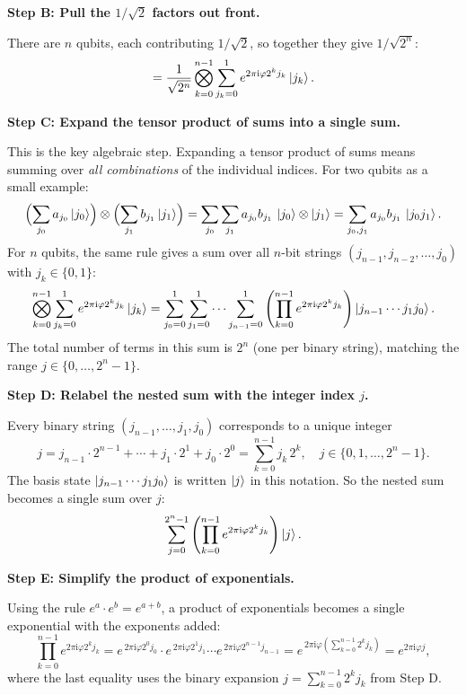 \documentclass[12pt,a4paper]{article}
\newcommand{\ii}{\mathrm{i}}
\begin{document}
\medskip
\noindent\textbf{Step B: Pull the $1/\sqrt{2}$ factors out front.}

There are $n$ qubits, each contributing $1/\sqrt{2}$, so together they give $1/\sqrt{2^n}$:
\[
  = \frac{1}{\sqrt{2^n}} \bigotimes_{k=0}^{n-1} \sum_{j_k=0}^{1} e^{2\pi\ii\varphi 2^k j_k}\Ket{j_k}.
\]

\medskip
\noindent\textbf{Step C: Expand the tensor product of sums into a single sum.}

This is the key algebraic step. Expanding a tensor product of sums means
summing over \emph{all combinations} of the individual indices. For two qubits
as a small example:
\[
  \Bigl(\sum_{j_0} a_{j_0}\Ket{j_0}\Bigr) \otimes \Bigl(\sum_{j_1} b_{j_1}\Ket{j_1}\Bigr)
  = \sum_{j_0}\sum_{j_1} a_{j_0} b_{j_1}\,\Ket{j_0}\otimes\Ket{j_1}
  = \sum_{j_0, j_1} a_{j_0} b_{j_1}\,\Ket{j_0 j_1}.
\]
For $n$ qubits, the same rule gives a sum over all $n$-bit strings
$(j_{n-1}, j_{n-2}, \ldots, j_0)$ with $j_k \in \{0,1\}$:
\[
  \bigotimes_{k=0}^{n-1} \sum_{j_k=0}^{1} e^{2\pi\ii\varphi 2^k j_k}\Ket{j_k}
  = \sum_{j_0=0}^{1}\sum_{j_1=0}^{1}\cdots\sum_{j_{n-1}=0}^{1}
    \left(\prod_{k=0}^{n-1} e^{2\pi\ii\varphi 2^k j_k}\right)
    \Ket{j_{n-1}\cdots j_1 j_0}.
\]
The total number of terms in this sum is $2^n$ (one per binary string), matching
the range $j \in \{0, \ldots, 2^n-1\}$.

\medskip
\noindent\textbf{Step D: Relabel the nested sum with the integer index $j$.}

Every binary string $(j_{n-1},\ldots,j_1,j_0)$ corresponds to a unique integer
\[
  j = j_{n-1}\cdot 2^{n-1} + \cdots + j_1\cdot 2^1 + j_0\cdot 2^0
    = \sum_{k=0}^{n-1} j_k\, 2^k, \quad j \in \{0,1,\ldots,2^n-1\}.
\]
The basis state $\Ket{j_{n-1}\cdots j_1 j_0}$ is written $\Ket{j}$ in this notation.
So the nested sum becomes a single sum over $j$:
\[
  \sum_{j=0}^{2^n-1}
    \left(\prod_{k=0}^{n-1} e^{2\pi\ii\varphi 2^k j_k}\right)
    \Ket{j}.
\]

\medskip
\noindent\textbf{Step E: Simplify the product of exponentials.}

Using the rule $e^{a}\cdot e^{b} = e^{a+b}$, a product of exponentials becomes
a single exponential with the exponents added:
\[
  \prod_{k=0}^{n-1} e^{2\pi\ii\varphi 2^k j_k}
  = e^{\,2\pi\ii\varphi 2^0 j_0}\cdot e^{\,2\pi\ii\varphi 2^1 j_1}\cdots e^{\,2\pi\ii\varphi 2^{n-1} j_{n-1}}
  = e^{\,2\pi\ii\varphi\left(\sum_{k=0}^{n-1} 2^k j_k\right)}
  = e^{2\pi\ii\varphi j},
\]
where the last equality uses the binary expansion $j = \sum_{k=0}^{n-1} 2^k j_k$
from Step D.
\end{document}
